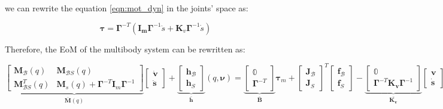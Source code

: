 we can rewrite the equation \ref{eqn:mot_dyn} in the joints' space as:

\begin{equation}
    \label{eqn:mot_dyn_jointspace}
    \boldsymbol{\tau} = \boldsymbol{\Gamma} ^{-T} (\mathbf{I_m}\boldsymbol{\Gamma} ^{-1} \ddot{s} + \mathbf{K}_v \boldsymbol{\Gamma} ^{-1}\dot{s})
\end{equation}

Therefore, the \ac{EoM} of the multibody system can be rewritten as:

$$
    \underbrace{\begin{bmatrix}
            \mathbf{M} _{\mathcal{B}}(q)     & \mathbf{M} _{\mathcal{B}S}(q)                                                      \\
            \mathbf{M} _{\mathcal{B}S} ^T(q) & \mathbf{M} _s(q) + \boldsymbol{\Gamma} ^{-T}\mathbf{I} _m\boldsymbol{\Gamma} ^{-1}
        \end{bmatrix}} _{\mathbf{\bar{M}}(q)}
    \begin{bmatrix}
        \dot{\mathrm{\mathbf{v}}} \\
        \ddot{\mathbf{s}}
    \end{bmatrix}+
    \underbrace{\begin{bmatrix}
            \mathbf{h} _{\mathcal{B}} \\
            \mathbf{h} _S
        \end{bmatrix}} _\mathbf{\bar{h}}(q,\boldsymbol{\nu}) =
    \underbrace{\begin{bmatrix}
            \mathbb{0} \\
            \boldsymbol{\Gamma} ^{-T}
        \end{bmatrix}} _{\mathbf{\bar{B}}}
    \boldsymbol{\tau} _m
    +
    \begin{bmatrix}
        \mathbf{J} _{\mathcal{B}} \\
        \mathbf{J} _S
    \end{bmatrix} ^T
    \begin{bmatrix}
        \mathbf{f} _{\mathcal{B}} \\
        \mathbf{f} _S
    \end{bmatrix}-
    \underbrace{\begin{bmatrix}
            \mathbb{0} \\
            \boldsymbol{\Gamma} ^{-T}\mathbf{K _v}\boldsymbol{\Gamma} ^{-1}
        \end{bmatrix}} _\mathbf{\bar{K _v}}
    \begin{bmatrix}
        \mathrm{\mathbf{v}} \\
        \dot{\mathbf{s}}
    \end{bmatrix}
$$

